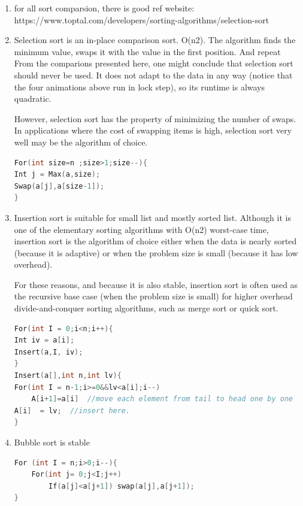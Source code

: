 \documentclass[a4paper,11pt,twoside]{book}
\begin{document}
\begin{enumerate}
\item for all sort comparsion, there is good ref website: https://www.toptal.com/developers/sorting-algorithms/selection-sort

\item Selection sort is an in-place comparison sort. O(n2). The algorithm finds the minimum value, swaps it with the value in the first position.  And repeat From the comparions presented here, one might conclude that selection sort should never be used. It does not adapt to the data in any way (notice that the four animations above run in lock step), so its runtime is always quadratic.

However, selection sort has the property of minimizing the number of swaps. In applications where the cost of swapping items is high, selection sort very well may be the algorithm of choice.
\begin{lstlisting}[frame=single, language=c++]
For(int size=n ;size>1;size--){
Int j = Max(a,size);
Swap(a[j],a[size-1]);
}
\end{lstlisting}

\item Insertion sort is suitable for small list and mostly sorted list. Although it is one of the elementary sorting algorithms with O(n2) worst-case time, insertion sort is the algorithm of choice either when the data is nearly sorted (because it is adaptive) or when the problem size is small (because it has low overhead).

For these reasons, and because it is also stable, insertion sort is often used as the recursive base case (when the problem size is small) for higher overhead divide-and-conquer sorting algorithms, such as merge sort or quick sort.

\begin{lstlisting}[frame=single, language=c++]
For(int I = 0;i<n;i++){
Int iv = a[i];
Insert(a,I, iv);
}
Insert(a[],int n,int lv){
For(int I = n-1;i>=0&&lv<a[i];i--)
    A[i+1]=a[i]  //move each element from tail to head one by one
A[i]  = lv;  //insert here. 
}
\end{lstlisting}

\item Bubble sort is stable 
\begin{lstlisting}[frame=single, language=c++]
For (int I = n;i>0;i--){
	For(int j= 0;j<I;j++)
		If(a[j]<a[j+1]) swap(a[j],a[j+1]);
}
\end{lstlisting}


\end{enumerate}
\end{document}
